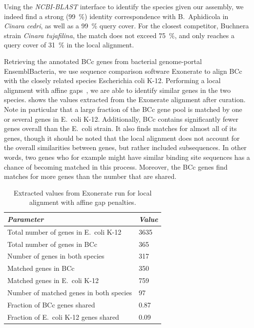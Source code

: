 \documentclass[10pt]{article}\usepackage[]{graphicx}\usepackage[]{color}
\theoremstyle{plain}
\theoremstyle{definition}
\begin{document}
\begin{multicols}{2}
Using the \textit{NCBI-BLAST} interface to identify the species given our assembly, we indeed find a strong (99~\%) identity correspondence with B.\ Aphidicola in \textit{Cinara cedri}, as well as a 99~\% query cover. For the closest competitor, Buchnera strain \textit{Cinara tujafilina}, the match does not exceed 75~\%, and only reaches a query cover of 31~\% in the local alignment. 

\vspace{-1.5pt}
Retrieving the annotated BCc genes from bacterial genome-portal EnsemblBacteria, we use sequence comparison software Exonerate to align BCc with the closely related species Escherichia coli K-12. Performing a local alignment with affine gaps~\cite{exonerate}, we are able to identify similar genes in the two species.  shows the values extracted from the Exonerate alignment after curation. Note in particular that a large fraction of the BCc gene pool is matched by one or several genes in E.\ coli K-12. Additionally, BCc contains significantly fewer genes overall than the E.\ coli strain. It also finds matches for almost all of its genes, though it should be noted that the local alignment does not account for the overall similarities between genes, but rather included subsequences. In other words, two genes who for example might have similar binding site sequences has a chance of becoming matched in this process. Moreover, the BCc genes find matches for more genes than the number that are shared.
\end{multicols}
\newpage
\begin{table}
\centering
\caption{Extracted values from Exonerate run for local alignment with affine gap penalties.}
\label{tab:exonerate}
\begin{tabular}{ll}
  \toprule
  \emph{Parameter} & \emph{Value}                     \\\midrule
  Total number of genes in E.\ coli K-12    &	3635    \\
  Total number of genes in BCc	            & 365     \\
  Number of genes in both species	          & 317     \\
  \midrule
  Matched genes in BCc      	              &	350     \\
  Matched genes in E.\ coli K-12            &	759     \\
  Number of matched genes in both species   &	97      \\
  \midrule
  Fraction of BCc genes shared     	        & 0.87    \\
  Fraction of E.\ coli K-12 genes shared	  & 0.09    \\\bottomrule
\end{tabular}
\end{table}
\end{document}
